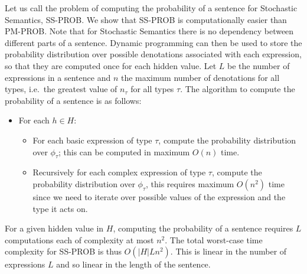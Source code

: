 \documentclass[a4paper,11pt]{article}
\theoremstyle{definition}
\begin{document}
Let us call the problem of computing the probability of a sentence for Stochastic Semantics, SS-PROB. We show that SS-PROB is computationally easier than PM-PROB.
Note that for Stochastic Semantics there is no dependency between different parts of a sentence.
Dynamic
programming can then be used to store the probability distribution over possible
denotations associated with each expression, so that they are computed once for
each hidden value. Let $L$ be the number of expressions in a sentence and
$n$ the maximum number of denotations for all types, i.e.~the greatest
value of $n_\tau$ for all types $\tau$. The algorithm to compute the
probability of a sentence is as follows:
\begin{itemize}
\item For each $h\in H$:
\begin{itemize}
\item For each basic expression of type $\tau$, compute the
  probability distribution over $\phi_\tau$; this can be computed in
  maximum $O(n)$ time.
\item Recursively for each complex expression of type $\tau$, compute
  the probability distribution over $\phi_\tau$, this requires maximum
  $O(n^2)$ time since we need to iterate over possible values of the
  expression and the type it acts on.
\end{itemize}
\end{itemize}
For a given hidden value in $H$, computing the probability of a sentence requires $L$
computations each of complexity at most $n^2$. The total worst-case
time complexity for SS-PROB is thus $O(|H|Ln^2)$. This is linear in the number of expressions $L$ and so linear in the length of the sentence. 





\end{document}

